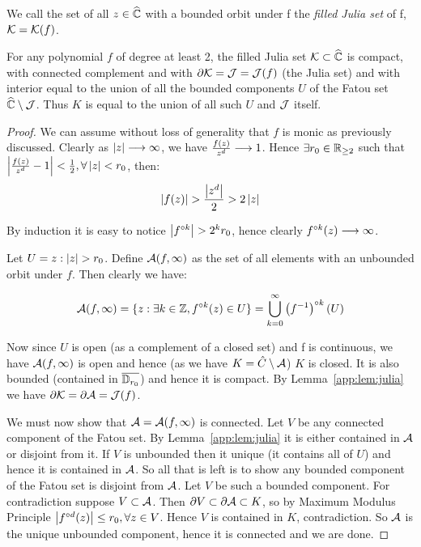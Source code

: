 \documentclass[../main.tex]{subfiles}
\begin{document}
\begin{dfn}
We call the set of all $z \in \widehat{\mathbb{C}}$ with a bounded orbit under f the \emph{filled Julia set} of f, $\mathcal{K} = \mathcal{K}(f)$. 
\end{dfn}

\begin{thm}
\label{9:thm:1.6}
For any polynomial $f$ of degree at least 2, the filled Julia set $\mathcal{K} \subset \widehat{\mathbb{C}}$ is compact, with connected complement and with $\partial \mathcal{K} = \mathcal{J} = \mathcal{J}(f)$ (the Julia set) and with interior equal to the union of all the bounded components $U$ of the Fatou set $\widehat{\mathbb{C}}\setminus\mathcal{J}$. Thus $K$ is equal to the union of all such $U$ and $\mathcal{J}$ itself. 
\end{thm}

\begin{proof}
We can assume without loss of generality that $f$ is monic as previously discussed. Clearly as $\left|z\right| \longrightarrow \infty$, we have $\frac{f(z)}{z^d} \longrightarrow 1$. Hence $\exists r_0 \in \mathbb{R}_{\geq 2}$ such that $\left|\frac{f(z)}{z^d}-1\right|<\frac{1}{2}, \forall \left|z\right|<r_0$, then:
$$\abs{f(z)}>\frac{\abs{z^d}}{2}>2\abs{z}$$

By induction it is easy to notice $\abs{\iter{f}{k}}>2^kr_0$, hence clearly $f^{\circ k}(z) \longrightarrow \infty$. 

Let $U = {z: \abs{z}>r_0}$. Define $\mathcal{A}(f, \infty)$ as the set of all elements with an unbounded orbit under $f$. Then clearly we have:

$$\mathcal{A}(f, \infty) = \{z : \exists k \in \mathbb{Z}, f^{\circ k}(z) \in U\} = \bigcup\limits_{k=0}^{\infty} \left(f^{-1}\right)^{\circ k}(U) $$

Now since $U$ is open (as a complement of a closed set) and f is continuous, we have $\mathcal{A}(f, \infty)$ is open and hence (as we have $K = \hat{C} \setminus \mathcal{A}$) $K$ is closed. It is also bounded (contained in $\overline{\mathbb{D}_{r_0}}$) and hence it is compact. By Lemma~\ref{app:lem:julia} we have $\partial \mathcal{K} = \partial \mathcal{A} = \mathcal{J}(f)$. 

We must now show that $\mathcal{A}=\mathcal{A}(f, \infty)$ is connected. 
Let $V$ be any connected component of the Fatou set. By Lemma~\ref{app:lem:julia} it is either contained in $\mathcal{A}$ or disjoint from it. If $V$ is unbounded then it unique (it contains all of $U$) and hence it is contained in $\mathcal{A}$. So all that is left is to show any bounded component of the Fatou set is disjoint from $\mathcal{A}$. Let $V$ be such a bounded component. For contradiction suppose $V\subset \mathcal{A}$. Then $\partial V \subset \partial \mathcal{A} \subset K$, so by Maximum Modulus Principle $\left|f^{\circ d}(z)\right| \leq r_0, \forall z \in V$. Hence $V$ is contained in $K$, contradiction. So $\mathcal{A}$ is the unique unbounded component, hence it is connected and we are done. 

\end{proof}
\end{document}
